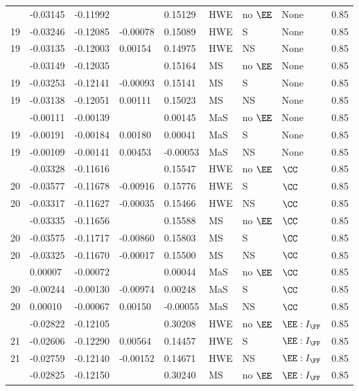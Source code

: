\begin{longtable}[t]{lllllllll}
\endfoot
\bottomrule
\endlastfoot
19 & -0.03145 & -0.11992 &  & 0.15129 & HWE & no $\EE$ & None & 0.85\\
19 & -0.03246 & -0.12085 & -0.00078 & 0.15089 & HWE & S & None & 0.85\\
19 & -0.03135 & -0.12003 & 0.00154 & 0.14975 & HWE & NS & None & 0.85\\
\addlinespace
19 & -0.03149 & -0.12035 &  & 0.15164 & MS & no $\EE$ & None & 0.85\\
19 & -0.03253 & -0.12141 & -0.00093 & 0.15141 & MS & S & None & 0.85\\
19 & -0.03138 & -0.12051 & 0.00111 & 0.15023 & MS & NS & None & 0.85\\
\addlinespace
19 & -0.00111 & -0.00139 &  & 0.00145 & MaS & no $\EE$ & None & 0.85\\
19 & -0.00191 & -0.00184 & 0.00180 & 0.00041 & MaS & S & None & 0.85\\
19 & -0.00109 & -0.00141 & 0.00453 & -0.00053 & MaS & NS & None & 0.85\\
\addlinespace
20 & -0.03328 & -0.11616 &  & 0.15547 & HWE & no $\EE$ & $\CC$ & 0.85\\
20 & -0.03577 & -0.11678 & -0.00916 & 0.15776 & HWE & S & $\CC$ & 0.85\\
20 & -0.03317 & -0.11627 & -0.00035 & 0.15466 & HWE & NS & $\CC$ & 0.85\\
\addlinespace
20 & -0.03335 & -0.11656 &  & 0.15588 & MS & no $\EE$ & $\CC$ & 0.85\\
20 & -0.03575 & -0.11717 & -0.00860 & 0.15803 & MS & S & $\CC$ & 0.85\\
20 & -0.03325 & -0.11670 & -0.00017 & 0.15500 & MS & NS & $\CC$ & 0.85\\
\addlinespace
20 & 0.00007 & -0.00072 &  & 0.00044 & MaS & no $\EE$ & $\CC$ & 0.85\\
20 & -0.00244 & -0.00130 & -0.00974 & 0.00248 & MaS & S & $\CC$ & 0.85\\
20 & 0.00010 & -0.00067 & 0.00150 & -0.00055 & MaS & NS & $\CC$ & 0.85\\
\addlinespace
21 & -0.02822 & -0.12105 &  & 0.30208 & HWE & no $\EE$ & $\EE:I_{\FF}$ & 0.85\\
21 & -0.02606 & -0.12290 & 0.00564 & 0.14457 & HWE & S & $\EE:I_{\FF}$ & 0.85\\
21 & -0.02759 & -0.12140 & -0.00152 & 0.14671 & HWE & NS & $\EE:I_{\FF}$ & 0.85\\
\addlinespace
21 & -0.02825 & -0.12150 &  & 0.30240 & MS & no $\EE$ & $\EE:I_{\FF}$ & 0.85\\

\end{longtable}
